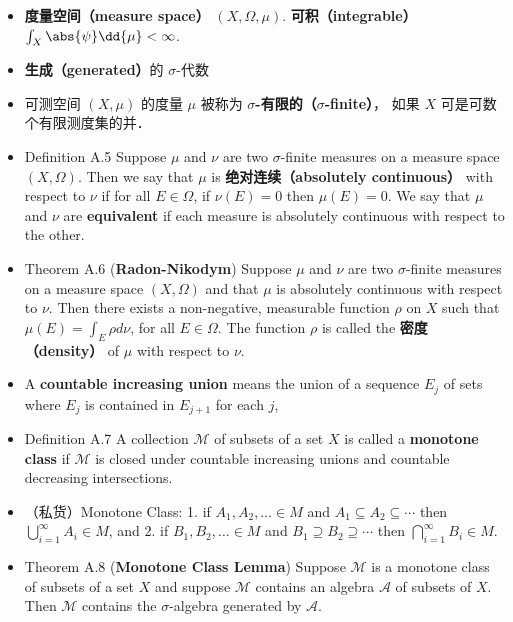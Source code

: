 \begin{itemize}
\item \textbf{度量空间（measure space）} $(X,\Omega,\mu)$. \textbf{可积（integrable）} $\int_X \abs{\psi} \dd{\mu} < \infty$.

\item \textbf{生成（generated）}的 $\sigma$-代数

\item 可测空间 $(X, \mu)$ 的度量 $\mu$ 被称为 \textbf{$\sigma$-有限的（$\sigma$-finite）}， 如果 $X$ 可是可数个有限测度集的并．

\item Definition A.5 Suppose $\mu$ and $\nu$ are two $\sigma$-finite measures on a measure space $(X, \Omega)$. Then we say that $\mu$ is \textbf{绝对连续（absolutely continuous）} with respect to $\nu$ if for all $E \in \Omega$, if $\nu(E)=0$ then $\mu(E)=0$. We say that $\mu$ and $\nu$ are \textbf{equivalent} if each measure is absolutely continuous with respect to the other.

\item Theorem A.6 (\textbf{Radon-Nikodym}) Suppose $\mu$ and $\nu$ are two $\sigma$-finite measures on a measure space $(X, \Omega)$ and that $\mu$ is absolutely continuous with respect to $\nu$. Then there exists a non-negative, measurable function $\rho$ on $X$ such that $\mu(E)=\int_{E} \rho d \nu$, for all $E \in \Omega$. The function $\rho$ is called the \textbf{密度（density）} of $\mu$ with respect to $\nu$.

\item A \textbf{countable increasing union} means the union of a sequence $E_j$ of sets
where $E_j$ is contained in $E_{j+1}$ for each $j$,

\item Definition A.7 A collection $\mathcal{M}$ of subsets of a set $X$ is called a \textbf{monotone class} if $\mathcal{M}$ is closed under countable increasing unions and countable decreasing intersections.

\item （私货）Monotone Class: 1. if $A_{1}, A_{2}, \ldots \in M$ and $A_{1} \subseteq A_{2} \subseteq \cdots$ then $\bigcup_{i=1}^{\infty} A_{i} \in M$, and 2. if $B_{1}, B_{2}, \ldots \in M$ and $B_{1} \supseteq B_{2} \supseteq \cdots$ then $\bigcap_{i=1}^{\infty} B_{i} \in M$.

\item Theorem A.8 (\textbf{Monotone Class Lemma}) Suppose $\mathcal{M}$ is a monotone class of subsets of a set $X$ and suppose $\mathcal{M}$ contains an algebra $\mathcal{A}$ of subsets of $X$. Then $\mathcal{M}$ contains the $\sigma$-algebra generated by $\mathcal{A}$.


\end{itemize}
